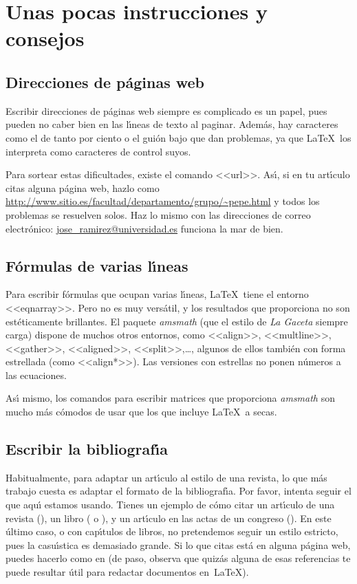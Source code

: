 \documentclass[autocontact]{gaceta}
\begin{document}
\section{Unas pocas instrucciones y consejos}

\subsection{Direcciones de p\'aginas web}

Escribir direcciones de p\'aginas web siempre es complicado es un papel, pues pueden no caber bien en las l\'{\i}neas de texto al paginar. Adem\'as, hay caracteres como el de tanto por ciento o el gui\'on bajo que dan problemas, ya que \LaTeX\ los interpreta como caracteres de control suyos.

Para sortear estas dificultades, existe el comando <<url>>. As\'{\i}, si en tu art\'{\i}culo citas alguna p\'agina web, hazlo como
\url{http://www.sitio.es/facultad/departamento/grupo/~pepe.html}
y todos los problemas se resuelven solos. Haz lo mismo con las direcciones de correo electr\'onico: \url{jose_ramirez@universidad.es} funciona la mar de bien.


\subsection{F\'ormulas de varias l\'{\i}neas}

Para escribir f\'ormulas que ocupan varias l\'{\i}neas, \LaTeX\ tiene el entorno <<eqnarray>>. Pero no es muy vers\'atil, y los resultados que proporciona no son est\'eticamente brillantes. El paquete \textit{amsmath} (que el estilo de \textit{La Gaceta} siempre carga) dispone de muchos otros entornos, como <<align>>, <<multline>>, <<gather>>, <<aligned>>, <<split>>,\dots, algunos de ellos tambi\'en con forma estrellada (como <<align*>>). Las versiones con estrellas no ponen n\'umeros a las ecuaciones.

As\'{\i} mismo, los comandos para escribir matrices que proporciona \textit{amsmath} son mucho m\'as c\'omodos de usar que los que incluye \LaTeX\ a secas.

\subsection{Escribir la bibliograf\'{\i}a}

Habitualmente, para adaptar un art\'{\i}culo al estilo de una revista, lo que m\'as trabajo cuesta es adaptar el formato de la bibliograf\'{\i}a. 
Por favor, intenta seguir el que aqu\'{\i} estamos usando. Tienes un ejemplo de c\'omo citar un art\'{\i}culo de una revista (\cite{Kn}), un libro (\cite{latex-imprenta} o \cite{latex-companion}), y un art\'{\i}culo en las actas de un congreso (\cite{Tao-ICM}). En este \'ultimo caso, o con cap\'{\i}tulos de libros, no pretendemos seguir un estilo estricto, pues la casu\'{\i}stica es demasiado grande. Si lo que citas est\'a en alguna p\'agina web, puedes hacerlo como en \cite{Be-spanish, Be-orto, Do, MeSl} (de paso, observa que quiz\'as alguna de esas referencias te puede resultar \'util para redactar documentos en~\LaTeX).
\end{document}
